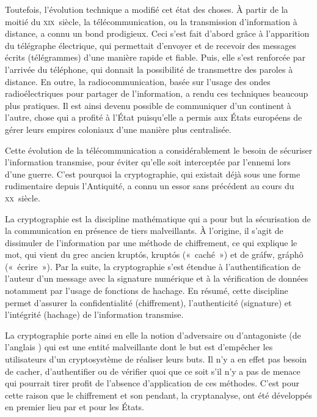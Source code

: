 Toutefois, l'évolution technique a modifié cet état des choses. À partir de la moitié du \textsc{xix}\ieme{}~siècle, la télécommunication, ou la transmission d'information à distance, a connu un bond prodigieux. Ceci s'est fait d'abord grâce à l'apparition du télégraphe électrique, qui permettait d'envoyer et de recevoir des messages écrits (télégrammes) d'une manière rapide et fiable. Puis, elle s'est renforcée par l'arrivée du téléphone, qui donnait la possibilité de transmettre des paroles à distance. En outre, la radiocommunication, basée sur l'usage des ondes radioélectriques pour partager de l'information, a rendu ces techniques beaucoup plus pratiques. Il est ainsi devenu possible de communiquer d'un continent à l'autre, chose qui a profité à l'État puisqu'elle a permis aux États européens de gérer leurs empires coloniaux d'une manière plus centralisée. %

Cette évolution de la télécommunication a considérablement le besoin de sécuriser l'information transmise, pour éviter qu'elle soit interceptée par l'ennemi lors d'une guerre. C'est pourquoi la cryptographie, qui existait déjà sous une forme rudimentaire depuis l'Antiquité, a connu un essor sans précédent au cours du \textsc{xx}\ieme{}~siècle.


La cryptographie est la discipline mathématique qui a pour but la sécurisation de la communication en présence de tiers malveillants. À l'origine, il s'agit de dissimuler de l'information par une méthode de chiffrement, ce qui explique le mot, qui vient du grec ancien \foreignlanguage{greek}{kruptós}, kruptós («~caché~») et de \foreignlanguage{greek}{gráfw}, gráphô («~écrire~»). Par la suite, la cryptographie s'est étendue à l'authentification de l'auteur d'un message avec la signature numérique et à la vérification de données notamment par l'usage de fonctions de hachage. En résumé, cette discipline permet d'assurer la confidentialité (chiffrement), l'authenticité (signature) et l'intégrité (hachage) de l'information transmise.


La cryptographie porte ainsi en elle la notion d'adversaire ou d'antagoniste (de l'anglais ) qui est une entité malveillante dont le but est d'empêcher les utilisateurs d'un cryptosystème de réaliser leurs buts. Il n'y a en effet pas besoin de cacher, d'authentifier ou de vérifier quoi que ce soit s'il n'y a pas de menace qui pourrait tirer profit de l'absence d'application de ces méthodes. C'est pour cette raison que le chiffrement et son pendant, la cryptanalyse, ont été développés en premier lieu par et pour les États.

